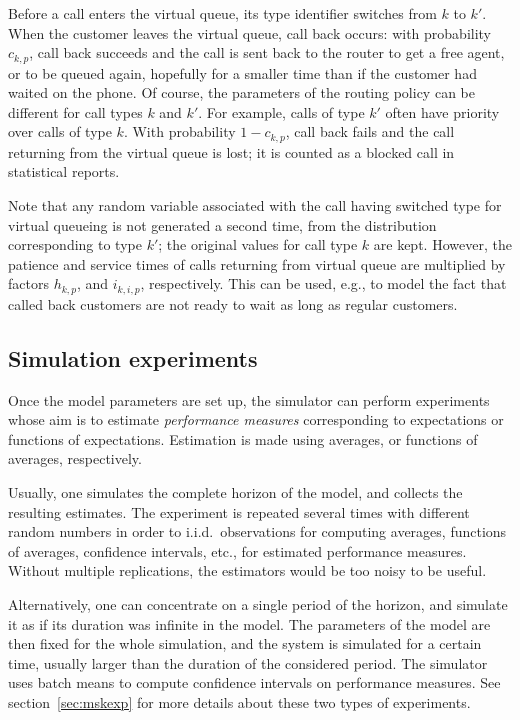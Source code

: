 Before a call enters the virtual queue,
its type identifier
switches from $k$ to $k'$.
When the customer leaves the virtual queue, call back occurs:
with probability $c_{k, p}$, call back succeeds and the call is sent
back to the router to get a free agent, or to be queued again,
hopefully for a smaller time than if the customer had waited on the
phone.  Of course,
the parameters of the routing policy can be different for call types
$k$ and $k'$. For example, calls of type $k'$ often have priority over
calls of type $k$.
With probability $1-c_{k, p}$, call back fails and the call returning
from the virtual queue is lost; it is counted as a blocked call in
statistical reports.

Note that any random variable associated with the call having switched
type for virtual queueing is not generated a second time, from the
distribution
corresponding to type $k'$; the original values for call type $k$ are
kept.
However, the patience and service times of calls returning from
virtual queue are
multiplied by factors $h_{k, p}$, and $i_{k, i, p}$, respectively.
This can be used, e.g., to model
the fact that called back customers are not ready to wait as long as
regular customers.

\subsection{Simulation experiments}
\label{sec:mskexpintro}

Once the model parameters are set up,
the simulator can perform experiments whose aim is to estimate
\emph{performance
measures} corresponding
to expectations
or functions of expectations. Estimation is made
using averages, or functions of averages, respectively.

Usually, one simulates the complete horizon of the model,
and collects the resulting estimates.
The experiment is repeated several times with different random numbers
in order to i.i.d.\ observations for computing
averages, functions of averages,
confidence intervals, etc., for estimated performance measures.
Without multiple replications, the estimators would be too noisy to be
useful.

Alternatively, one can concentrate on a single period of the
horizon, and simulate it as if its duration was infinite in the model.
The parameters of the model are then fixed for the whole
simulation, and the system is
simulated for a certain time, usually larger than the duration of the
considered period.
The simulator uses batch means
\cite{sLAW00a,iBUI05b} to
compute confidence intervals on performance measures.
See section~\ref{sec:mskexp} for more details about these two types of
experiments.

